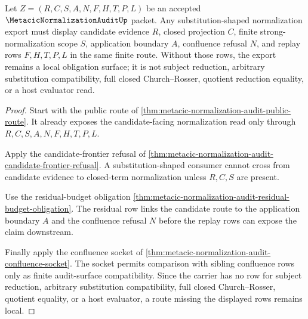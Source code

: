 \begin{theorem}
\label{thm:metacic-normalization-audit-candidate-substitution-boundary}
Let $Z=(R,C,S,A,N,F,H,T,P,L)$ be an accepted $\MetacicNormalizationAuditUp$ packet. Any substitution-shaped normalization export must display candidate evidence $R$, closed projection $C$, finite strong-normalization scope $S$, application boundary $A$, confluence refusal $N$, and replay rows $F,H,T,P,L$ in the same finite route. Without those rows, the export remains a local obligation surface; it is not subject reduction, arbitrary substitution compatibility, full closed Church--Rosser, quotient reduction equality, or a host evaluator read.
\end{theorem}
\begin{proof}
Start with the public route of \autoref{thm:metacic-normalization-audit-public-route}. It already exposes the candidate-facing normalization read only through $R,C,S,A,N,F,H,T,P,L$.

Apply the candidate-frontier refusal of \autoref{thm:metacic-normalization-audit-candidate-frontier-refusal}. A substitution-shaped consumer cannot cross from candidate evidence to closed-term normalization unless $R,C,S$ are present.

Use the residual-budget obligation \autoref{thm:metacic-normalization-audit-residual-budget-obligation}. The residual row links the candidate route to the application boundary $A$ and the confluence refusal $N$ before the replay rows can expose the claim downstream.

Finally apply the confluence socket of \autoref{thm:metacic-normalization-audit-confluence-socket}. The socket permits comparison with sibling confluence rows only as finite audit-surface compatibility. Since the carrier has no row for subject reduction, arbitrary substitution compatibility, full closed Church--Rosser, quotient equality, or a host evaluator, a route missing the displayed rows remains local.
\end{proof}


